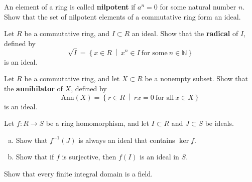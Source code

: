 \documentclass{problemset}
\begin{document}
\begin{exercise} An element of a ring is called {\bf nilpotent} if \(a^n=0\) for some natural number \(n\).  Show that the set of nilpotent elements of a commutative ring form an ideal.
\end{exercise}



\begin{exercise} 
Let \(R\) be a commutative ring, and \(I \subset R\) an ideal.  Show that the {\bf radical} of \(I\), defined by
\[ \sqrt{I} = \left\{ x \in R\ \middle|\ x^n \in I\ \text{for some}\ n \in \mathbb{N}\right\}\]
is an ideal.
\end{exercise}


\begin{exercise} Let \(R\) be a commutative ring, and let \(X \subset R\) be a nonempty subset.  Show that the {\bf annihilator} of \(X\), defined by
\[\mathrm{Ann}(X)=\left\{ r \in R\ \middle|\ rx=0\ \text{for all}\ x\in X\right\}\]
is an ideal.
\end{exercise}


\begin{exercise} Let \(f:R \rightarrow S\) be a ring homomorphism, and let \(I \subset R\) and \(J \subset S\) be ideals.
\begin{enumerate}[(a)]
\item Show that \(f^{-1}(J)\) is always an ideal that contains \(\ker f\).
\item Show that if \(f\) is surjective, then \(f(I)\) is an ideal in \(S\).
\end{enumerate}
\end{exercise}



\begin{exercise} Show that every finite integral domain is a field.
\end{exercise}

\end{document}
